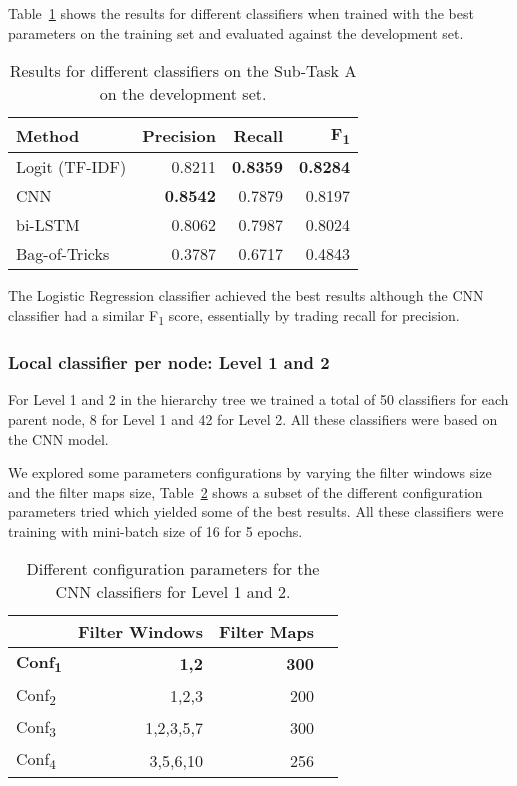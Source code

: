 \documentclass[11pt,a4paper]{article}
\begin{document}
Table~\ref{subtask_a_devset-results} shows the results for different classifiers
when trained with the best parameters on the training set and evaluated against
the development set.

\begin{table}[!h]
\begin{center}
\begin{tabular}{|l|r|r|r|}
\hline\centering\textbf{Method}  & \textbf{Precision} &  \textbf{Recall} &  \textbf{F\textsubscript{1}}\\
\hline
 Logit (TF-IDF) & 0.8211 & \textbf{0.8359} & \textbf{0.8284} \\
 CNN            & \textbf{0.8542} & 0.7879 & 0.8197 \\
 bi-LSTM        & 0.8062 & 0.7987 & 0.8024 \\
 Bag-of-Tricks  & 0.3787 & 0.6717 & 0.4843 \\
\hline
\end{tabular}
\end{center}
\caption{\label{subtask_a_devset-results} Results for different classifiers on
         the Sub-Task A on the development set.}
\end{table}

The Logistic Regression classifier achieved the best results
although the CNN classifier  had a similar F\textsubscript{1} score, essentially
by trading recall for precision.


\subsubsection{Local classifier per node: Level 1 and 2}

For Level 1 and 2 in the hierarchy tree we trained a total of 50 classifiers
for each parent node, 8 for Level 1 and 42 for Level 2. All these classifiers
were based on the CNN model.

We explored some parameters configurations by varying the filter windows size and
the filter maps size, Table~\ref{subtask_b_parameters_local} shows a subset of the different
configuration parameters tried which yielded some of the best results. All these
classifiers were training with mini-batch size of 16 for 5 epochs.

\begin{table}[!h]
\begin{center}
\begin{tabular}{|l|r|r|r|}
\hline\centering\textbf{}  & \textbf{Filter Windows} &  \textbf{Filter Maps} \\
\hline
\textbf{Conf\textsubscript{1}} & \textbf{1,2}       & \textbf{300} \\
Conf\textsubscript{2} & 1,2,3     & 200 \\
Conf\textsubscript{3} & 1,2,3,5,7 & 300 \\
Conf\textsubscript{4} & 3,5,6,10  & 256 \\
\hline
\end{tabular}
\end{center}
\caption{\label{subtask_b_parameters_local} Different configuration parameters
for the CNN classifiers for Level 1 and 2.}
\end{table}
\end{document}
